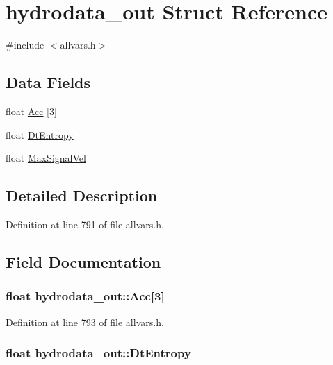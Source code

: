 \hypertarget{structhydrodata__out}{
\section{hydrodata\_\-out Struct Reference}
\label{structhydrodata__out}
}


{\ttfamily \#include $<$allvars.h$>$}

\subsection*{Data Fields}
\begin{DoxyCompactItemize}
\item 
float \hyperlink{structhydrodata__out_a7b3945aaa01f12e5af8be7731b362661}{Acc} \mbox{[}3\mbox{]}
\item 
float \hyperlink{structhydrodata__out_a0bd5bd8b7c1ec82abf3e5f001543441c}{DtEntropy}
\item 
float \hyperlink{structhydrodata__out_a6f4c65630e80c636a128d59e0afc4dad}{MaxSignalVel}
\end{DoxyCompactItemize}


\subsection{Detailed Description}


Definition at line 791 of file allvars.h.



\subsection{Field Documentation}
\hypertarget{structhydrodata__out_a7b3945aaa01f12e5af8be7731b362661}{
\subsubsection[{Acc}]{\setlength{\rightskip}{0pt plus 5cm}float {\bf hydrodata\_\-out::Acc}\mbox{[}3\mbox{]}}}
\label{structhydrodata__out_a7b3945aaa01f12e5af8be7731b362661}


Definition at line 793 of file allvars.h.

\hypertarget{structhydrodata__out_a0bd5bd8b7c1ec82abf3e5f001543441c}{
\subsubsection[{DtEntropy}]{\setlength{\rightskip}{0pt plus 5cm}float {\bf hydrodata\_\-out::DtEntropy}}}
\label{structhydrodata__out_a0bd5bd8b7c1ec82abf3e5f001543441c}



